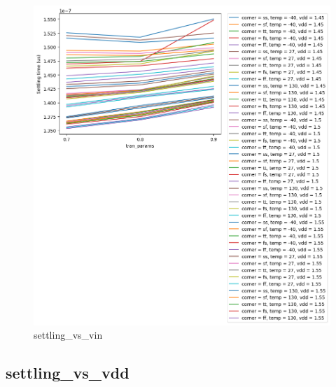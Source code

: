\documentclass[
  a4paper,
  DIV=11,
  numbers=noendperiod]{scrartcl}
\begin{document}
\begin{tcolorbox}
\begin{figure}[H]
{\centering \includegraphics{./cace/_docs/ota-5t/schematic/settling_vs_vin.png}

}

\caption{settling\_vs\_vin}

\end{figure}%

\subsection{settling\_vs\_vdd}\label{settling_vs_vdd}

\begin{figure}[H]


\end{figure}
\end{tcolorbox}
\end{document}
